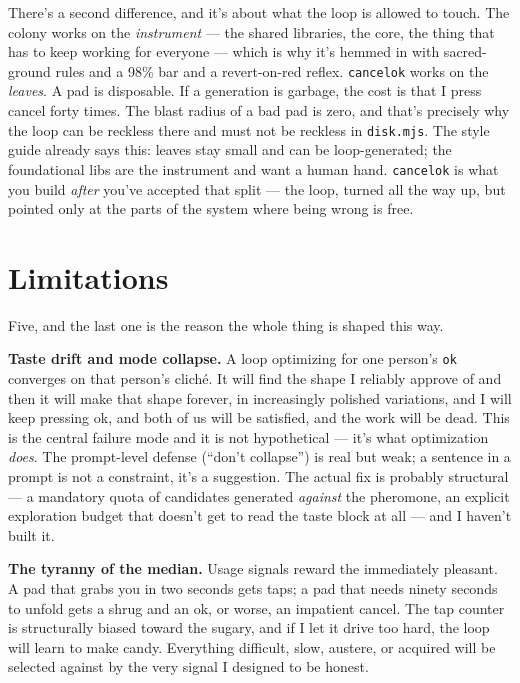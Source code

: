 \documentclass[10pt,letterpaper,twocolumn]{article}
\begin{document}
There's a second difference, and it's about what the loop is allowed to touch. The colony works on the \emph{instrument} --- the shared libraries, the core, the thing that has to keep working for everyone --- which is why it's hemmed in with sacred-ground rules and a 98\% bar and a revert-on-red reflex. \texttt{cancelok} works on the \emph{leaves}. A pad is disposable. If a generation is garbage, the cost is that I press cancel forty times. The blast radius of a bad pad is zero, and that's precisely why the loop can be reckless there and must not be reckless in \texttt{disk.mjs}. The style guide already says this: leaves stay small and can be loop-generated; the foundational libs are the instrument and want a human hand. \texttt{cancelok} is what you build \emph{after} you've accepted that split --- the loop, turned all the way up, but pointed only at the parts of the system where being wrong is free.


\section{Limitations}

Five, and the last one is the reason the whole thing is shaped this way.

\textbf{Taste drift and mode collapse.} A loop optimizing for one person's \texttt{ok} converges on that person's cliché. It will find the shape I reliably approve of and then it will make that shape forever, in increasingly polished variations, and I will keep pressing ok, and both of us will be satisfied, and the work will be dead. This is the central failure mode and it is not hypothetical --- it's what optimization \emph{does}. The prompt-level defense (``don't collapse'') is real but weak; a sentence in a prompt is not a constraint, it's a suggestion. The actual fix is probably structural --- a mandatory quota of candidates generated \emph{against} the pheromone, an explicit exploration budget that doesn't get to read the taste block at all --- and I haven't built it.

\textbf{The tyranny of the median.} Usage signals reward the immediately pleasant. A pad that grabs you in two seconds gets taps; a pad that needs ninety seconds to unfold gets a shrug and an ok, or worse, an impatient cancel. The tap counter is structurally biased toward the sugary, and if I let it drive too hard, the loop will learn to make candy. Everything difficult, slow, austere, or acquired will be selected against by the very signal I designed to be honest.
\end{document}
